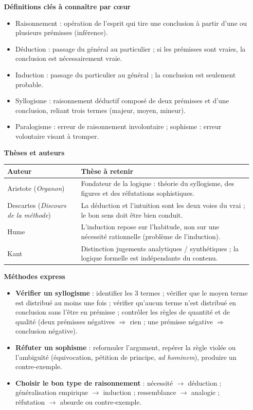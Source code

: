 \documentclass[11pt]{article}
\newcommand{\cle}[1]{{\popxbold\color{popdark}#1}}
\begin{document}
\begin{bilan}
\textbf{Définitions clés à connaître par cœur}
\begin{itemize}
  \item \cle{Raisonnement} : opération de l'esprit qui tire une \cle{conclusion} à partir d'une ou plusieurs \cle{prémisses} (inférence).
  \item \cle{Déduction} : passage du général au particulier ; si les prémisses sont vraies, la conclusion est nécessairement vraie.
  \item \cle{Induction} : passage du particulier au général ; la conclusion est seulement probable.
  \item \cle{Syllogisme} : raisonnement déductif composé de deux prémisses et d'une conclusion, reliant trois termes (majeur, moyen, mineur).
  \item \cle{Paralogisme} : erreur de raisonnement involontaire ; \cle{sophisme} : erreur volontaire visant à tromper.
\end{itemize}

\textbf{Thèses et auteurs}
\begin{center}
\begin{tabularx}{\linewidth}{|l|X|}
\hline
\rowcolor{popblueL} \textbf{Auteur} & \textbf{Thèse à retenir} \\
\hline
Aristote (\emph{Organon}) & Fondateur de la logique : théorie du syllogisme, des figures et des réfutations sophistiques. \\
\hline
Descartes (\emph{Discours de la méthode}) & La déduction et l'intuition sont les deux voies du vrai ; le bon sens doit être bien conduit. \\
\hline
Hume & L'induction repose sur l'habitude, non sur une nécessité rationnelle (problème de l'induction). \\
\hline
Kant & Distinction jugements analytiques / synthétiques ; la logique formelle est indépendante du contenu. \\
\hline
\end{tabularx}
\end{center}

\textbf{Méthodes express}
\begin{itemize}
  \item \textbf{Vérifier un syllogisme} : identifier les 3 termes ; vérifier que le moyen terme est distribué au moins une fois ; vérifier qu'aucun terme n'est distribué en conclusion sans l'être en prémisse ; contrôler les règles de quantité et de qualité (deux prémisses négatives $\Rightarrow$ rien ; une prémisse négative $\Rightarrow$ conclusion négative).
  \item \textbf{Réfuter un sophisme} : reformuler l'argument, repérer la règle violée ou l'ambiguïté (équivocation, pétition de principe, \emph{ad hominem}), produire un contre-exemple.
  \item \textbf{Choisir le bon type de raisonnement} : nécessité $\rightarrow$ déduction ; généralisation empirique $\rightarrow$ induction ; ressemblance $\rightarrow$ analogie ; réfutation $\rightarrow$ absurde ou contre-exemple.
\end{itemize}
\end{bilan}
\end{document}
